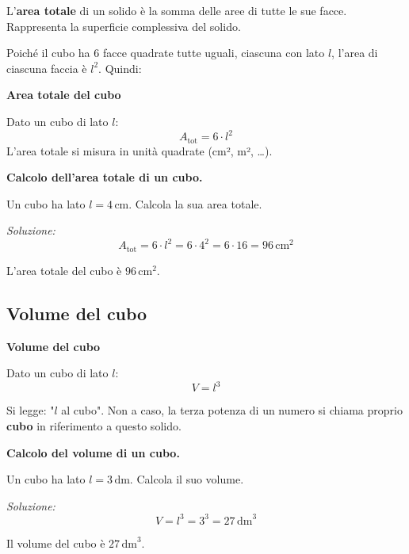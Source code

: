 \begin{definizione}
    L'\textbf{area totale} di un solido è la somma delle aree di tutte le sue facce. Rappresenta la superficie complessiva del solido.
\end{definizione}

Poiché il cubo ha 6 facce quadrate tutte uguali, ciascuna con lato $l$, l'area di ciascuna faccia è $l^2$. Quindi:

\begin{regola}
    \textbf{Area totale del cubo}

    Dato un cubo di lato $l$:
    \[
        A_{\text{tot}} = 6 \cdot l^2
    \]
    L'area totale si misura in unità quadrate (cm², m², …).
\end{regola}

\begin{esempio}
    \textbf{Calcolo dell'area totale di un cubo.}

    Un cubo ha lato $l = 4\,\text{cm}$. Calcola la sua area totale.

    \medskip
    \textit{Soluzione:}
    \[
        A_{\text{tot}} = 6 \cdot l^2 = 6 \cdot 4^2 = 6 \cdot 16 = 96\,\text{cm}^2
    \]

    L'area totale del cubo è $96\,\text{cm}^2$.
\end{esempio}

\subsection{Volume del cubo}

\begin{regola}
    \textbf{Volume del cubo}

    Dato un cubo di lato $l$:
    \[
        V = l^3
    \]

    Si legge: "$l$ al cubo". Non a caso, la terza potenza di un numero si chiama proprio \textbf{cubo} in riferimento a questo solido.
\end{regola}

\begin{esempio}
    \textbf{Calcolo del volume di un cubo.}

    Un cubo ha lato $l = 3\,\text{dm}$. Calcola il suo volume.

    \medskip
    \textit{Soluzione:}
    \[
        V = l^3 = 3^3 = 27\,\text{dm}^3
    \]

    Il volume del cubo è $27\,\text{dm}^3$.
\end{esempio}

